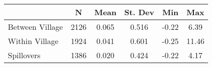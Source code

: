 \begin{tabular}{l*{5}{c}}\hline&\multicolumn{1}{c}{N}&\multicolumn{1}{c}{Mean}&\multicolumn{1}{c}{St. Dev}&\multicolumn{1}{c}{Min}&\multicolumn{1}{c}{Max}\\ \hline 
Between Village & 2126 & 0.065 & 0.516 & -0.22 & 6.39 \\
Within Village & 1924 & 0.041 & 0.601 & -0.25 & 11.46 \\
Spillovers & 1386 & 0.020 & 0.424 & -0.22 & 4.17 \\
\hline \end{tabular}
